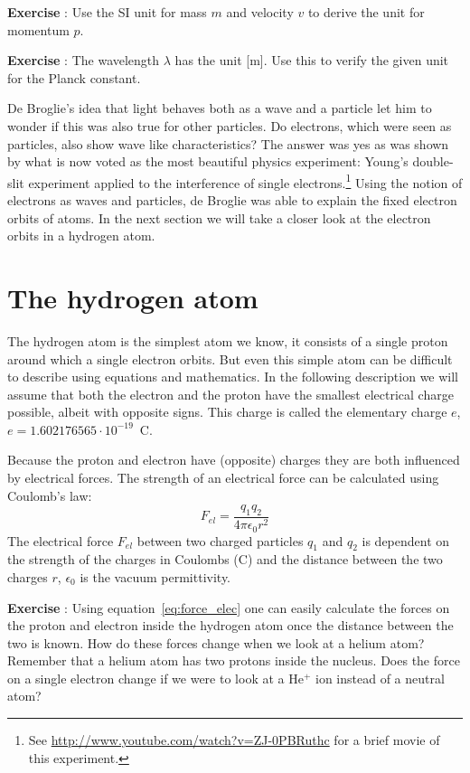 \documentclass[12pt,a4paper]{article}
\numberwithin{equation}{section}
\numberwithin{figure}{section}
\newcounter{Exercise}
\numberwithin{table}{section}
\begin{document}
\begin{shaded} \textbf{Exercise \theExercise {}} : Use the SI unit for mass $m$ and velocity $v$ to derive the unit for momentum $p$. \end{shaded}
\begin{shaded} \textbf{Exercise \theExercise {}} : The wavelength $\lambda$ has the unit [m]. Use this to verify the given unit for the Planck constant. \end{shaded}

De Broglie's idea that light behaves both as a wave and a particle let him to wonder if this was also true for other particles. Do electrons, which were seen as particles, also show wave like characteristics? The answer was yes as was shown by what is now voted as the most beautiful physics experiment: Young's double-slit experiment applied to the interference of single electrons.\footnote{See \url{http://www.youtube.com/watch?v=ZJ-0PBRuthc} for a brief movie of this experiment.} Using the notion of electrons as waves and particles, de Broglie was able to explain the fixed electron orbits of atoms. In the next section we will take a closer look at the electron orbits in a hydrogen atom.

\section{The hydrogen atom}
The hydrogen atom is the simplest atom we know, it consists of a single proton around which a single electron orbits. But even this simple atom can be difficult to describe using equations and mathematics. In the following description we will assume that both the electron and the proton have the smallest electrical charge possible, albeit with opposite signs. This charge is called the elementary charge $e$, $e=1.602176565 \cdot 10^{-19}$~C.

Because the proton and electron have (opposite) charges they are both influenced by electrical forces. The strength of an electrical force can be calculated using Coulomb's law:
\begin{equation}
F_{el} = \frac{q_1 q_2}{4 \pi \epsilon_0 r^2} \label{eq:force_elec} 
\end{equation}
The electrical force $F_{el}$ between two charged particles $q_1$ and $q_2$ is dependent on the strength of the charges in Coulombs (C) and the distance between the two charges $r$, $\epsilon_0$ is the vacuum permittivity. 

\begin{shaded} \textbf{Exercise \theExercise {}} : Using equation~\ref{eq:force_elec} one can easily calculate the forces on the proton and electron inside the hydrogen atom once the distance between the two is known. How do these forces change when we look at a helium atom? Remember that a helium atom has two protons inside the nucleus. Does the force on a single electron change if we were to look at a He$^+$ ion instead of a neutral atom?\end{shaded}
\end{document}
